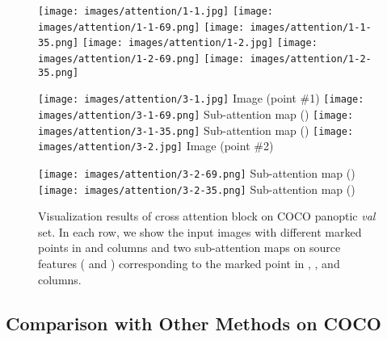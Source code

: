 \documentclass[runningheads]{llncs}
\begin{document}
\begin{figure}[t]
\small
{}
  \texttt{[image: images/attention/1-1.jpg]}
\endminipage\hfill
{}
  \texttt{[image: images/attention/1-1-69.png]}
\endminipage\hfill
{}\texttt{[image: images/attention/1-1-35.png]}
\endminipage \hfill
{}
  \texttt{[image: images/attention/1-2.jpg]}
\endminipage\hfill
{}
  \texttt{[image: images/attention/1-2-69.png]}
\endminipage\hfill
{}\texttt{[image: images/attention/1-2-35.png]}
\endminipage 



\centering
  \texttt{[image: images/attention/3-1.jpg]}
 Image \:    (point \#1) 
\endminipage\hfill
{}
\centering
  \texttt{[image: images/attention/3-1-69.png]}
  Sub-attention map ()
\endminipage\hfill
{}\centering
  \texttt{[image: images/attention/3-1-35.png]}
  Sub-attention map ()
\endminipage \hfill
{}
\centering
  \texttt{[image: images/attention/3-2.jpg]}
 Image \:    (point \#2) 

\endminipage\hfill
{}
\centering
  \texttt{[image: images/attention/3-2-69.png]}
  Sub-attention map ()
\endminipage\hfill
{}\centering
  \texttt{[image: images/attention/3-2-35.png]}
  \small{Sub-attention map ()}
\endminipage 
\caption{Visualization results of cross attention block on COCO panoptic \emph{val} set. In each row, we show the input images with different marked points in  and  columns and two sub-attention maps on source features ( and ) corresponding to the marked point in  ,  ,   and   columns.  }
\label{fig:cla_fusion_attention}
\end{figure}

\subsection{Comparison with Other Methods on COCO}
 
\end{document}
